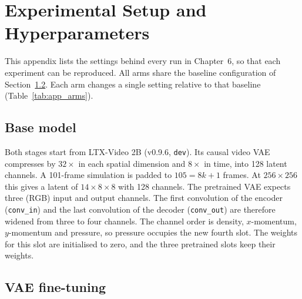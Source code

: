 
\appendix

\chapter{Experimental Setup and Hyperparameters}
\label{app:setup}

This appendix lists the settings behind every run in Chapter~6, so that each
experiment can be reproduced. All arms share the baseline configuration of
Section~\ref{app:setup_vae}. Each arm changes a single setting relative to that
baseline (Table~\ref{tab:app_arms}).

\section{Base model}
\label{app:setup_base}

Both stages start from LTX-Video 2B (v0.9.6, \texttt{dev}). Its causal video
VAE compresses by $32\times$ in each spatial dimension and $8\times$ in time,
into 128 latent channels. A 101-frame simulation is padded to $105 = 8k+1$
frames. At $256\times256$ this gives a latent of $14\times8\times8$ with 128
channels. The pretrained VAE expects three (RGB) input and output channels. The
first convolution of the encoder (\texttt{conv\_in}) and the last convolution
of the decoder (\texttt{conv\_out}) are therefore widened from three to four
channels. The channel order is density, $x$-momentum, $y$-momentum and
pressure, so pressure occupies the new fourth slot. The weights for this slot
are initialised to zero, and the three pretrained slots keep their weights.

\section{VAE fine-tuning}
\label{app:setup_vae}

